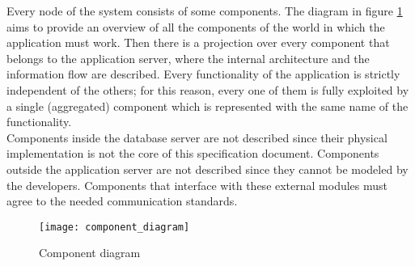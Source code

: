 \documentclass[./main.tex]{subfiles}
\begin{document}
Every node of the system consists of some components. The diagram in figure
\ref{fig:component_diagram} aims to provide an overview of all the components
of the world in which the application must work. Then there is a projection
over every component that belongs to the application server, where the internal
architecture and the information flow are described. Every functionality of the
application is strictly independent of the others; for this reason, every one
of them is fully exploited by a single (aggregated) component which is
represented with the same name of the functionality.\medskip\\
Components inside the database server are not described since their physical
implementation is not the core of this specification document. Components
outside the application server are not described since they cannot be modeled
by the developers. Components that interface with these external modules must
agree to the needed communication standards.

\begin{figure}[H]
\centering
\texttt{[image: component\_diagram]}
\caption{Component diagram}
\label{fig:component_diagram}
\end{figure}
\end{document}
